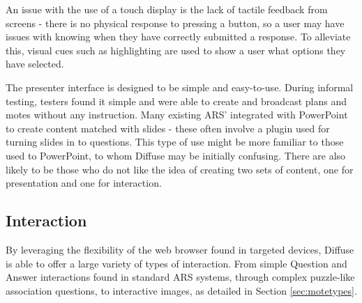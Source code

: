 \documentclass[a4papert,11pt,notitlepage]{article}
\begin{document}
An issue with the use of a touch display is the lack of tactile feedback from screens - there is no physical response to pressing a button, so a user may have issues with knowing when they have correctly submitted a response. To alleviate this, visual cues such as highlighting are used to show a user what options they have selected.

The presenter interface is designed to be simple and easy-to-use. During informal testing, testers found it simple and were able to create and broadcast plans and motes without any instruction. Many existing ARS' integrated with PowerPoint to create content matched with slides - these often involve a plugin used for turning slides in to questions. This type of use might be more familiar to those used to PowerPoint, to whom Diffuse may be initially confusing. There are also likely to be those who do not like the idea of creating two sets of content, one for presentation and one for interaction.

\subsection{Interaction}
By leveraging the flexibility of the web browser found in targeted devices, Diffuse is able to offer a large variety of types of interaction. From simple Question and Answer interactions found in standard ARS systems, through complex puzzle-like association questions, to interactive images, as detailed in Section \ref{sec:motetypes}. 
\end{document}
